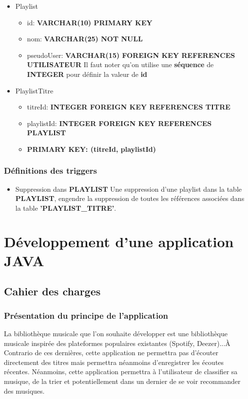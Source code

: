 \documentclass[a4paper,12pt, french]{report}
\begin{document}
\begin{itemize}
\begin{itemize}
        \end{itemize}
      \item Playlist
        \begin{itemize}
          \item id: \textbf{VARCHAR(10) PRIMARY KEY}
          \item nom: \textbf{VARCHAR(25) NOT NULL}
          \item pseudoUser: \textbf{VARCHAR(15) FOREIGN KEY REFERENCES UTILISATEUR}
          Il faut noter qu'on utilise une \textbf{séquence} de \textbf{INTEGER} pour définir la valeur de \textbf{id}
        \end{itemize}
      \item PlaylistTitre
        \begin{itemize}
          \item titreId: \textbf{INTEGER FOREIGN KEY REFERENCES TITRE}
          \item playlistId: \textbf{INTEGER FOREIGN KEY REFERENCES PLAYLIST}
          \item \textbf{PRIMARY KEY: (titreId, playlistId)}
        \end{itemize}
      \end{itemize}
  \subsection{Définitions des triggers }
    \begin{itemize}
      \item Suppression dans \textbf{PLAYLIST} \newline
        Une suppression d'une playlist dans la table \textbf{PLAYLIST}, engendre la suppression de toutes les références associées dans la table \textbf{'PLAYLIST\_TITRE'}.
    \end{itemize}

\chapter{Développement d'une application JAVA}
\section{Cahier des charges}
  \subsection{Présentation du principe de l'application}
    La bibliothèque musicale que l'on souhaite développer est une bibliothèque musicale inspirée des plateformes populaires existantes (Spotify, Deezer)...À Contrario de ces dernières, cette application ne permettra pas d'écouter directement des titres mais permettra néanmoins d'enregistrer les écoutes récentes. Néanmoins, cette application permettra à l'utilisateur de classifier sa musique, de la trier et potentiellement dans un dernier de se voir recommander des musiques.
\end{document}

